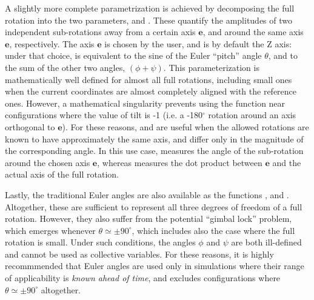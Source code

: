 A slightly more complete parametrization is achieved by decomposing the full rotation into the two parameters,  and .
These quantify the amplitudes of two independent sub-rotations away from a certain axis $\mathbf{e}$, and around the same axis $\mathbf{e}$, respectively.
The axis $\mathbf{e}$ is chosen by the user, and is by default the Z axis:
under that choice,  is equivalent to the sine of the Euler ``pitch'' angle $\theta$, and  to the sum of the other two angles, $(\phi + \psi)$.
This parameterization is mathematically well defined for almost all full rotations, including small ones when the current coordinates are almost completely aligned with the reference ones.
However, a mathematical singularity prevents using the  function near configurations where the value of tilt  is -1 (i.e.{} a -180$^\circ$ rotation around an axis orthogonal to $\mathbf{e}$).
For these reasons,  and  are useful when the allowed rotations are known to have approximately the same axis, and differ only in the magnitude of the corresponding angle.
In this use case,  measures the angle of the sub-rotation around the chosen axis $\mathbf{e}$, whereas  measures the dot product between $\mathbf{e}$ and the actual axis of the full rotation.

Lastly, the traditional Euler angles are also available as the functions ,  and .
Altogether, these are sufficient to represent all three degrees of freedom of a full rotation.
However, they also suffer from the potential ``gimbal lock'' problem, which emerges whenever $\theta \simeq \pm 90^\circ$, which includes also the case where the full rotation is small.
Under such conditions, the angles $\phi$ and $\psi$ are both ill-defined and cannot be used as collective variables.
For these reasons, it is highly recommmended that Euler angles are used only in simulations where their range of applicability is \emph{known ahead of time}, and excludes configurations where  $\theta \simeq \pm 90^\circ$ altogether.


